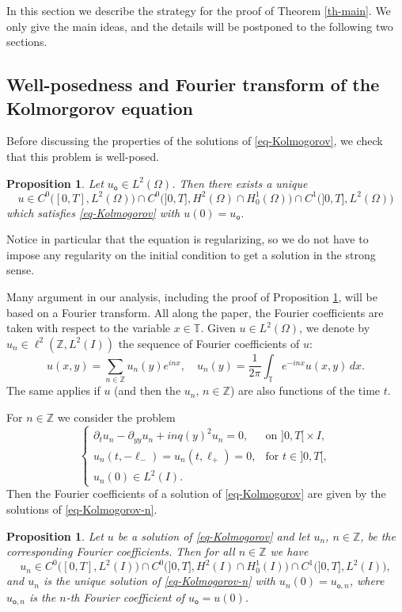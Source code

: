 \documentclass[11pt]{article}
\newcommand{\Subsection}{\subsection}
\numberwithin{equation}{section}
\theoremstyle{plain}
\newtheorem{proposition}[theorem]{Proposition}
\theoremstyle{definition}
\newcommand{\1}{\mathds 1}
\newcommand{\Z}{\mathbb{Z}}
\newcommand{\T}{\mathbb{T}}
\let\O\Omega
\newcommand{\uo}{u_{\mathsf{o}}}
\begin{document}
In this section we describe the strategy for the proof of Theorem \ref{th-main}. We only give the main ideas, and the details will be postponed to the following two sections.

\Subsection{Well-posedness and Fourier transform of the Kolmorgorov equation}

Before discussing the properties of the solutions of \eqref{eq-Kolmogorov}, we check that this problem is well-posed.

\begin{proposition} \label{prop-well-posedness}
Let $\uo \in L^2(\O)$. Then there exists a unique
\[
u \in C^0 \bigl([0,T],L^2(\O) \bigr) \cap C^0 \bigl(]0,T],H^2(\O) \cap H^1_0(\O) \bigr) \cap C^1 \bigl(]0,T], L^2(\O) \bigr)
\]
which satisfies \eqref{eq-Kolmogorov} with $u(0) = \uo$.
\end{proposition}

Notice in particular that the equation is regularizing, so we do not have to impose any regularity on the initial condition to get a solution in the strong sense.

Many argument in our analysis, including the proof of Proposition \ref{prop-well-posedness}, will be based on a Fourier transform. All along the paper, the Fourier coefficients are taken with respect to the variable $x \in \T$. Given $u \in L^2(\O)$, we denote by $u_n \in \ell^2(\Z,L^2(I))$ the sequence of Fourier coefficients of $u$:
\[
u(x,y) = \sum_{n\in \mathbb{Z}} u_n(y) e^{i n x}, \quad u_n (y) = \frac 1 {2\pi} \int_\T e^{-inx} u(x,y) \, dx.
\]
The same applies if $u$ (and then the $u_n$, $n \in \Z$) are also functions of the time $t$.

For $n \in \Z$ we consider the problem
\begin{equation} \label{eq-Kolmogorov-n}
\begin{cases}
\partial_t u_n - \partial_{yy} u_n + inq(y)^2 u_n = 0, & \text{on } ]0,T[{}\times I,\\
u_n(t,-\ell_-) = u_n(t,\ell_+) = 0, & \text{for } t \in{}]0,T[,\\
u_n(0) \in L^2(I).
\end{cases}
\end{equation}
Then the Fourier coefficients of a solution of \eqref{eq-Kolmogorov} are given by the solutions of \eqref{eq-Kolmogorov-n}.

\begin{proposition} \label{prop-well-posedness-n}
Let $u$ be a solution of \eqref{eq-Kolmogorov} and let $u_n$, $n \in \Z$, be the corresponding Fourier coefficients. Then for all $n \in \Z$ we have
\[
u_n \in C^0 \bigl([0,T],L^2(I) \bigr) \cap C^0 \bigl(]0,T],H^2(I) \cap H^1_0(I) \bigr) \cap C^1 \bigl(]0,T], L^2(I) \bigr),
\]
and $u_n$ is the unique solution of \eqref{eq-Kolmogorov-n} with $u_n(0) = u_{\mathsf{o},n}$, where $u_{\mathsf{o},n}$ is the $n$-th Fourier coefficient of $\uo = u(0)$.
\end{proposition}
\end{document}
